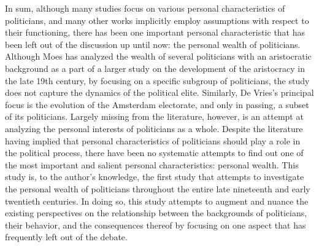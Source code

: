

    In sum, although many studies focus on various personal characteristics of politicians, and many other works implicitly employ assumptions with respect to their functioning, there has been one important personal characteristic that has been left out of the discussion up until now: the personal wealth of politicians. Although Moes has analyzed the wealth of several politicians with an aristocratic background as a part of a larger study on the development of the aristocracy in the late 19th century, by focusing on a specific subgroup of politicians, the study does not capture the dynamics of the political elite. Similarly, De Vries's principal focus is the evolution of the Amsterdam electorate, and only in passing, a subset of its politicians.\autocite{de1986electoraat} Largely missing from the literature, however, is an attempt at analyzing the personal interests of politicians as a whole. Despite the literature having implied that personal characteristics of politicians should play a role in the political process, there have been no systematic attempts to find out one of the most important and salient personal characteristics: personal wealth. This study is, to the author's knowledge, the first study that attempts to investigate the personal wealth of politicians throughout the entire late nineteenth and early twentieth centuries. In doing so, this study attempts to augment and nuance the existing perspectives on the relationship between the backgrounds of politicians, their behavior, and the consequences thereof by focusing on one aspect that has frequently left out of the debate. 
    
